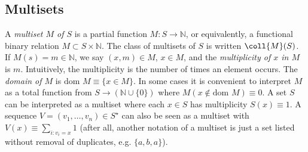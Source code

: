 \documentclass[english]{article}
\newcommand\ternary[3]{
  \left\{ \begin{array}{ll}
      {#2}
      & \textit{if }{#1}\\
      {#3}
      & \textit{otherwise}
    \end{array} \right.
}
\newcommand\geneq{{\approx}}
\newcommand\comment[1]{}
\newcommand\into{\rightarrow}
\newcommand\union{\cup}
\newcommand\bigconcat{\bullet}
\newcommand\naturals{\mathbb{N}}
\newcommand\nonnegints{(\naturals \union\{0\})}
\newcommand\domain[1]{\text{dom }#1}
\newcommand\multiset[1]{\coll{M}(#1)}
\newcommand\seqn[2]{({#1}_{1},\ldots,{#1}_{#2})}
\newcommand\st{\;|\;}
\newcommand{\kstar}{^{\star}}
\begin{document}
\comment{
The \emph{letters in $s$} are $letters_{s}=\{
l|\exists i\in{indices_{s}}:s[i]=l\}$.
The \emph{spans} of $s$ are
$spans_{s}=\{(a,b)\in{\{\mathbb{{N}}^{2}\st1\leq a\leq b\leq n+1\}}$, and the
\emph{substring at span $p=(a,b)$} of $s$ is $s\downarrow p\equiv(s_{a},\ldots
s_{b-1})$, with $s\downarrow(a,a)=()$.
The \emph{subsequences} of $s$ are given
by a \emph{subsequence map} $f\in subseqmap_s$:
\[
subseqmap_s\equiv
\{\seqn{i}{n}\in indices_s\kstar\st i_1 < \ldots <  i_n \}
\]
A subsequence of $s$ by map $f$ is $s[f]$.  (The subsequences of $s$ are $subseq_s\equiv \{s[f]\st f\in
subseqmap_s\}$).  For a letter $\sigma\in \Sigma$ there is exactly one maximal
subsequence consisting of repetitions of that letter, and its map is
$subseqmap_s(\sigma)$:
\[
subseqmap_{s}^{\geneq}(\sigma)\equiv \bigconcat_{i=1}^{|s|} \ternary{s[i]\geneq\sigma}{(i)}{()}
\]
Note the $\geneq$ superscript, which, if omitted, is assumed to be the usual
equality ($=$).  Different $\geneq$ predicates can be useful for matching on
projections of $\Sigma$.  This convention will be assumed throughout.

We can extend a function $f:\Sigma\into \Delta$, to sequences by mapping it over each element $f:\Sigma\kstar\into\Delta\kstar$, where $f(s\in\Sigma\kstar)=(f(s[1]),\ldots,f(s[|s|]))$.
}

\subsection{Multisets}

A \emph{multiset $M$ of $S$} is a partial function $M:S\into \naturals$, or
equivalently, a functional binary relation $M\subset S\times \naturals$.  The
class of multisets of $S$ is written $\multiset{S}$.  If $M(s)=m\in{\naturals}$,
we say $(x,m)\in{M}$, $x\in{M}$, and the \emph{multiplicity of $x$ in $M$} is
$m$.  Intuitively, the multiplicity is the number of times an element occurs.
The \emph{domain of $M$} is $\domain{M}\equiv \{x\in{M}\}$. In some cases it is
convenient to interpret $M$ as a total function from $S\rightarrow \nonnegints$
where $M(x\notin{\domain{M}})\equiv 0$.  A set $S$ can be interpreted as a
multiset where each $x\in{S}$ has multiplicity $S(x)\equiv 1$.  A sequence
$V=\seqn{v}{n}\in{S\kstar}$ can also be seen as a multiset with
$V(x)\equiv \sum_{i:v_{i}=x}1$ (after all, another notation of a multiset is just a
set listed without removal of duplicates, e.g. $\{a,b,a\}$).
\end{document}
